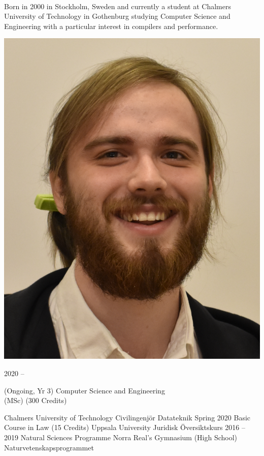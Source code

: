 \documentclass[9pt]{developercv}
\begin{document}
\begin{minipage}[t]{0.7\textwidth}
	\vspace{-\baselineskip}
	\\Born in 2000 in Stockholm, Sweden and currently a student at Chalmers
	University of Technology in Gothenburg studying Computer Science and
	Engineering with a particular interest in compilers and performance.
\end{minipage}
\hfill
\begin{minipage}[t]{0.2\textwidth}
	\vspace{-\baselineskip}
	\includegraphics[width=\linewidth]{smaller.png}
\end{minipage}
\begin{entrylist}
	\entry
		{2020 -- }
		{
			\begin{minipage}[t]{0.5\textwidth}
				(Ongoing, Yr 3) Computer Science and Engineering \\ (MSc) (300 Credits)
			\end{minipage}
		}
		{Chalmers University of Technology}
		{Civilingenjör Datateknik}
	\entry
		{Spring 2020}
		{Basic Course in Law (15 Credits)}
		{Uppsala University}
		{Juridisk Översiktskurs}
	\entry
		{2016 -- 2019}
		{Natural Sciences Programme}
		{Norra Real's Gymnasium (High School)}
		{Naturvetenskapsprogrammet}
\end{entrylist}
\end{document}
